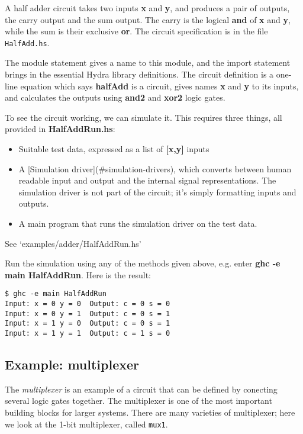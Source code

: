 \documentclass[11pt]{article}
\begin{document}
A half adder circuit takes two inputs \textbf{x} and \textbf{y}, and produces a pair
of outputs, the carry output and the sum output.  The carry is the
logical \textbf{and} of \textbf{x} and \textbf{y}, while the sum is their exclusive \textbf{or}.
The circuit specification is in the file \texttt{HalfAdd.hs}.

The module statement gives a name to this module, and the import
statement brings in the essential Hydra library definitions.  The
circuit definition is a one-line equation which says \textbf{halfAdd} is a
circuit, gives names \textbf{x} and \textbf{y} to its inputs, and calculates the
outputs using \textbf{and2} and \textbf{xor2} logic gates.

To see the circuit working, we can simulate it.  This requires
three things, all provided in \textbf{HalfAddRun.hs}:

\begin{itemize}
\item Suitable test data, expressed as a list of \textbf{[x,y]} inputs

\item A [Simulation driver](\#simulation-drivers), which converts between
human readable input and output and the internal signal
representations.  The simulation driver is not part of the
circuit; it's simply formatting inputs and outputs.

\item A main program that runs the simulation driver on the test data.
\end{itemize}

See `examples/adder/HalfAddRun.hs'

Run the simulation using any of the methods given above, e.g. enter
\textbf{ghc -e main HalfAddRun}.  Here is the result:

\begin{verbatim}
$ ghc -e main HalfAddRun
Input: x = 0 y = 0  Output: c = 0 s = 0
Input: x = 0 y = 1  Output: c = 0 s = 1
Input: x = 1 y = 0  Output: c = 0 s = 1
Input: x = 1 y = 1  Output: c = 1 s = 0
\end{verbatim}

\subsection{Example: multiplexer}
\label{sec:org90ce762}

The \emph{multiplexer} is an example of a circuit that can be defined by
conecting several logic gates together. The multiplexer is one of the
most important building blocks for larger systems.  There are many
varieties of multiplexer; here we look at the 1-bit multiplexer,
called \texttt{mux1}.
\end{document}
